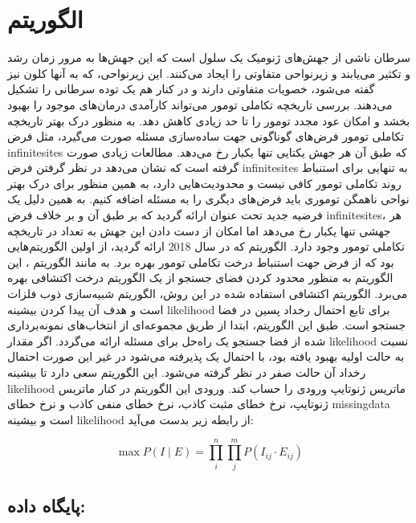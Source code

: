 \section{الگوریتم  \cite{ciccolella2021inferring}}
سرطان ناشی از جهش‌های ژنومیک یک سلول است که این جهش‌ها به مرور زمان رشد و تکثیر می‌یابند و زیرنواحی متفاوتی را ایجاد می‌کنند. این زیرنواحی، که به آنها کلون نیز گفته می‌شود، خصویات متفاوتی دارند و در کنار هم یک توده سرطانی را تشکیل می‌دهند. بررسی تاریخچه تکاملی تومور می‌تواند کارآمدی درمان‌های موجود را بهبود بخشد و امکان عود مجدد تومور را تا حد زیادی کاهش دهد. به منظور درک بهتر تاریخچه تکاملی تومور فرض‌های گوناگونی جهت ساده‌سازی مسئله صورت می‌گیرد، مثل فرض \gls{infinitesites} که طبق آن هر جهش یکتایی تنها یکبار رخ می‌دهد. مطالعات زیادی صورت گرفته است که نشان می‌دهد در نظر گرفتن فرض \gls{infinitesites} به تنهایی برای استنباط روند تکاملی تومور کافی نیست و محدودیت‌هایی دارد، به همین منظور برای درک بهتر نواحی ناهمگن توموری باید فرض‌های دیگری را به مسئله اضافه کنیم. به همین دلیل یک فرضیه جدید تحت عنوان  ارائه گردید که بر طبق آن و بر خلاف فرض \gls{infinitesites}، هر جهشی تنها یکبار رخ می‌دهد اما امکان از دست دادن این جهش به تعداد  در تاریخچه تکاملی تومور وجود دارد. الگوریتم  که در سال 2018 ارائه گردید، از اولین الگوریتم‌هایی بود که از فرض  جهت استنباط درخت تکاملی تومور بهره برد. به مانند الگوریتم ، این الگوریتم به منظور محدود کردن فضای جستجو از یک الگوریتم درخت اکتشافی بهره می‌برد. الگوریتم اکتشافی استفاده شده در این روش، الگوریتم شبیه‌سازی ذوب فلزات است و هدف آن پیدا کردن بیشینه \gls{likelihood} برای تابع احتمال رخداد پسین در فضا جستجو است. طبق این الگوریتم، ابتدا از طریق مجموعه‌ای از انتخاب‌های نمونه‌برداری شده از فضا جستجو یک راه‌حل برای مسئله ارائه می‌گردد. اگر مقدار \gls{likelihood} نسبت به حالت اولیه بهبود یافته بود، با احتمال یک پذیرفته می‌شود در غیر این صورت احتمال رخداد آن حالت صفر در نظر گرفته می‌شود. این الگوریتم سعی دارد تا بیشینه \gls{likelihood} ماتریس ژنوتایپ ورودی را حساب کند. ورودی این الگوریتم در کنار ماتریس ژنوتایپ، نرخ خطای مثبت کاذب، نرخ  خطای منفی کاذب و نرخ خطای \gls{missingdata} است و بیشینه \gls{likelihood} از رابطه زیر بدست می‌آید: 

\begin{equation}
	\max P(I \mid E)=\prod_{i}^{n} \prod_{j}^{m} P\left(I_{i j} \cdot E_{i j}\right)
\end{equation}

\subsection{پایگاه داده: }

